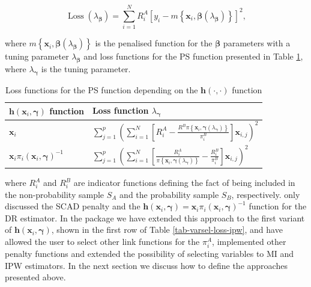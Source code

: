 \documentclass[
]{jss}
\begin{document}
\begin{equation}  
\operatorname{Loss}\left(\lambda_{\boldsymbol{\beta}}\right)=\sum_{i=1}^N R_i^A\left[y_i-m\left\{\boldsymbol{x}_i, \boldsymbol{\beta}(\lambda_{\boldsymbol{\beta}})\right\}\right]^2,
\label{eq-varsel-loss-mi}
\end{equation}

where
\(m\left\{\boldsymbol{x}_i, \boldsymbol{\beta}(\lambda_{\boldsymbol{\beta}})\right\}\)
is the penalised function for the \(\boldsymbol{\beta}\) parameters with
a tuning parameter \(\lambda_{\boldsymbol{\beta}}\) and loss functions
for the PS function presented in Table \ref{tab-varsel-loss-ipw}, where
\(\lambda_{\boldsymbol{\gamma}}\) is the tuning parameter.

\begin{table}[ht!]
\centering
\begin{tabular}{ll}
\hline
$\boldsymbol{h}(\boldsymbol{x}_i, \boldsymbol{\gamma})$ function &  Loss function $\lambda_{\boldsymbol{\gamma}}$ \\
\hline
$\boldsymbol{x}_i$ & $\sum_{j=1}^p\left(\sum_{i=1}^N\left[R_i^A - \frac{R^B\pi\left\{\boldsymbol{x}_i, \boldsymbol{\gamma}(\lambda_{\boldsymbol{\gamma}})\right\}}{\pi_i^B}\right] \boldsymbol{x}_{i, j}\right)^2$\\
\hline
$\boldsymbol{x}_i \pi_i(\boldsymbol{x}_i, \boldsymbol{\gamma})^{-1}$ & $\sum_{j=1}^p\left(\sum_{i=1}^N\left[\frac{R_i^A}{\pi\left\{\boldsymbol{x}_i, \boldsymbol{\gamma}(\lambda_{\boldsymbol{\gamma}})\right\}}-\frac{R_i^B}{\pi_i^B}\right] \boldsymbol{x}_{i, j}\right)^2$ \\
\hline
\end{tabular}
\caption{Loss functions for the PS function depending on the $\boldsymbol{h}(\cdot,\cdot)$ function}
\label{tab-varsel-loss-ipw}
\end{table}

where \(R_i^A\) and \(R_i^B\) are indicator functions defining the fact
of being included in the non-probability sample \(S_A\) and the
probability sample \(S_B\), respectively. \citet{yang_doubly_2020} only
discussed the SCAD penalty and the
\(\boldsymbol{h}(\boldsymbol{x}_i, \boldsymbol{\gamma})=\boldsymbol{x}_i \pi_i(\boldsymbol{x}_i, \boldsymbol{\gamma})^{-1}\)
function for the DR estimator. In the  package we have
extended this approach to the first variant of
\(\boldsymbol{h}(\boldsymbol{x}_i, \boldsymbol{\gamma})\), shown in the
first row of Table \eqref{tab-varsel-loss-ipw}, and have allowed the
user to select other link functions for the \(\pi_i^A\), implemented
other penalty functions and extended the possibility of selecting
variables to MI and IPW estimators. In the next section we discuss how
to define the approaches presented above.
\end{document}
